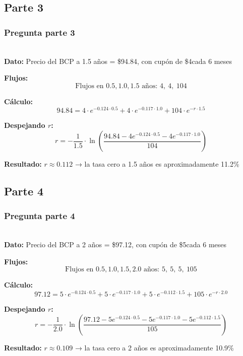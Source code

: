 \documentclass{beamer}
\newcommand{\taaunoCinco}{11.2\%}
\newcommand{\tados}{10.9\%}
\newcommand{\rtaseis}{0.124}
\newcommand{\rtaunio}{0.117}
\newcommand{\rtaaunoCinco}{0.112}
\newcommand{\rtados}{0.109}
\newcommand{\PunoCinco}{94.84}  %
\newcommand{\Pdos}{97.12}       %
\newcommand{\CunoCinco}{4}  %
\newcommand{\Cdos}{5}       %
\newif\ifpresentacion
\newcommand{\pausa}{\ifpresentacion\pause\fi}
\begin{document}
\subsection{Parte 3}
\begin{frame}
  \frametitle{Pregunta  parte 3}
  \LARGE {} \\[1em]

  \footnotesize
  \textbf{Dato:} Precio del BCP a 1.5 años = \$\PunoCinco, con cupón de \$\CunoCinco cada 6 meses

  \pausa

  \textbf{Flujos:}
  \[
  \text{Flujos en } 0.5, 1.0, 1.5 \text{ años: } \CunoCinco,\ \CunoCinco,\ 104
  \]

  \pausa

  \textbf{Cálculo:}
  \[
  \PunoCinco = \CunoCinco \cdot e^{-\rtaseis \cdot 0.5} + \CunoCinco \cdot e^{-\rtaunio \cdot 1.0} + 104 \cdot e^{-r \cdot 1.5}
  \]

  \pausa

  \textbf{Despejando $r$:}
  \[
  r = -\frac{1}{1.5} \cdot \ln\left( \frac{\PunoCinco - \CunoCinco e^{-\rtaseis \cdot 0.5} - \CunoCinco e^{-\rtaunio \cdot 1.0}}{104} \right)
  \]
  \pausa

  \textbf{Resultado:} \( r \approx \rtaaunoCinco \) → la tasa cero a 1.5 años es aproximadamente \taaunoCinco
\end{frame}

\subsection{Parte 4}
\begin{frame}
  \frametitle{Pregunta  parte 4}
  \LARGE {} \\[1em]

  \footnotesize
  \textbf{Dato:} Precio del BCP a 2 años = \$\Pdos, con cupón de \$\Cdos cada 6 meses

  \pausa

  \textbf{Flujos:}
  \[
  \text{Flujos en } 0.5, 1.0, 1.5, 2.0 \text{ años: } \Cdos,\ \Cdos,\ \Cdos,\ 105
  \]

  \pausa

  \textbf{Cálculo:}
  \[
  \Pdos = \Cdos \cdot e^{-\rtaseis \cdot 0.5} + \Cdos \cdot e^{-\rtaunio \cdot 1.0} + \Cdos \cdot e^{-\rtaaunoCinco \cdot 1.5} + 105 \cdot e^{-r \cdot 2.0}
  \]

  \pausa

  \textbf{Despejando $r$:}
  \[
  r = -\frac{1}{2.0} \cdot \ln\left( \frac{\Pdos - \Cdos e^{-\rtaseis \cdot 0.5} - \Cdos e^{-\rtaunio \cdot 1.0} - \Cdos e^{-\rtaaunoCinco \cdot 1.5}}{105} \right)
  \]
  \pausa

  \textbf{Resultado:} \( r \approx \rtados \) → la tasa cero a 2 años es aproximadamente \tados
\end{frame}
\end{document}

